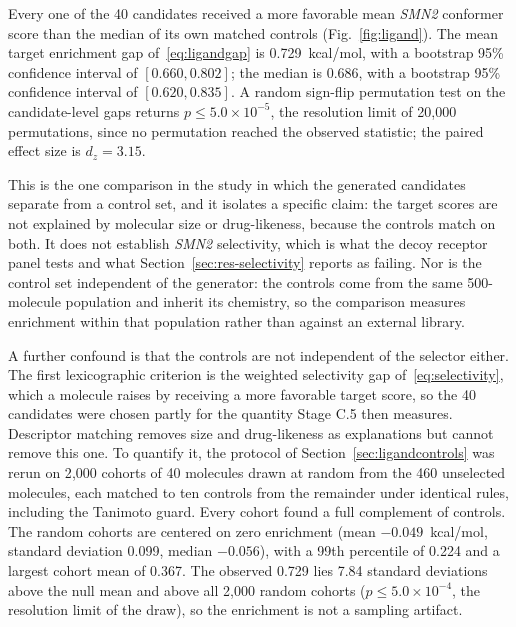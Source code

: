 \documentclass[journal]{IEEEtran}
\begin{document}
Every one of the 40 candidates received a more favorable mean
\textit{SMN2} conformer score than the median of its own matched controls
(Fig.~\ref{fig:ligand}). The mean target enrichment gap
of~\eqref{eq:ligandgap} is 0.729~kcal/mol, with a bootstrap 95\%
confidence interval of $[0.660, 0.802]$; the median is 0.686, with a
bootstrap 95\% confidence interval of $[0.620, 0.835]$. A random sign-flip permutation test on
the candidate-level gaps returns $p \le 5.0 \times 10^{-5}$, the
resolution limit of 20{,}000 permutations, since no permutation reached
the observed statistic; the paired effect size is $d_{z} = 3.15$.

This is the one comparison in the study in which the generated
candidates separate from a control set, and it isolates a specific
claim: the target scores are not explained by molecular size or
drug-likeness, because the controls match on both. It does not
establish \textit{SMN2} selectivity, which is what the decoy receptor
panel tests and what Section~\ref{sec:res-selectivity} reports as
failing. Nor is the control set independent of the generator: the
controls come from the same 500-molecule population and inherit its
chemistry, so the comparison measures enrichment within that population
rather than against an external library.

A further confound is that the controls are not independent of the
selector either. The first lexicographic criterion is the weighted
selectivity gap of~\eqref{eq:selectivity}, which a molecule raises by
receiving a more favorable target score, so the 40 candidates were chosen
partly for the quantity Stage C.5 then measures. Descriptor matching
removes size and drug-likeness as explanations but cannot remove this
one. To quantify it, the protocol of Section~\ref{sec:ligandcontrols}
was rerun on 2{,}000 cohorts of 40 molecules drawn at random from the
460 unselected molecules, each matched to ten controls from the
remainder under identical rules, including the Tanimoto guard. Every
cohort found a full complement of controls. The random cohorts are
centered on zero enrichment (mean $-0.049$~kcal/mol, standard deviation
0.099, median $-0.056$), with a 99th percentile of 0.224 and a largest
cohort mean of 0.367. The observed 0.729 lies 7.84 standard deviations
above the null mean and above all 2{,}000 random cohorts
($p \le 5.0 \times 10^{-4}$, the resolution limit of the draw), so the
enrichment is not a sampling artifact.
\end{document}
